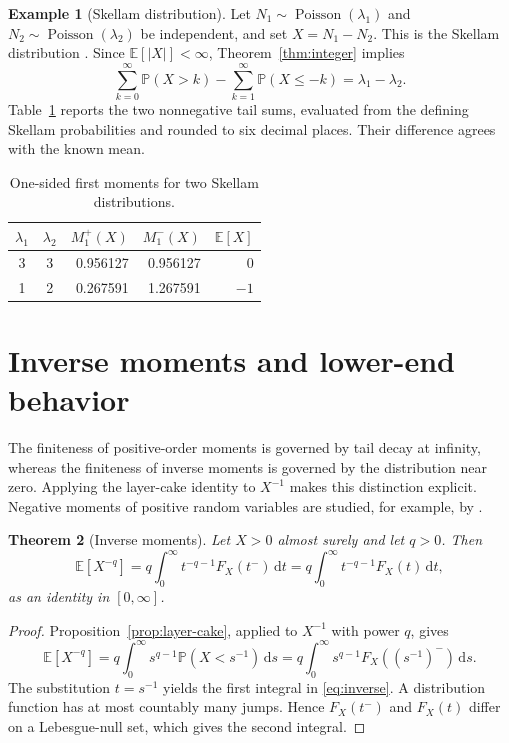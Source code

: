 \documentclass[11pt]{article}
\newtheorem{theorem}{Theorem}[section]
\theoremstyle{definition}
\newtheorem{example}[theorem]{Example}
\theoremstyle{remark}
\newcommand{\E}{\mathbb{E}}
\newcommand{\Pp}{\mathbb{P}}
\newcommand{\dd}{\,\mathrm{d}}
\newcommand{\abs}[1]{\left\lvert #1\right\rvert}
\begin{document}
\begin{example}[Skellam distribution]\label{ex:skellam}
Let $N_1\sim\operatorname{Poisson}(\lambda_1)$ and
$N_2\sim\operatorname{Poisson}(\lambda_2)$ be independent, and set
$X=N_1-N_2$.  This is the Skellam distribution
\citep{Skellam1946}.  Since $\E[\abs X]<\infty$,
Theorem~\ref{thm:integer} implies
\[
  \sum_{k=0}^\infty\Pp(X>k)
  -\sum_{k=1}^\infty\Pp(X\leq-k)
  =\lambda_1-\lambda_2.
\]
Table~\ref{tab:skellam} reports the two nonnegative tail sums, evaluated from
the defining Skellam probabilities and rounded to six decimal places.  Their
difference agrees with the known mean.

\begin{table}[h]
\centering
\caption{One-sided first moments for two Skellam distributions.}
\label{tab:skellam}
\begin{tabular}{ccrrr}
\toprule
$\lambda_1$&$\lambda_2$&$M_1^+(X)$&$M_1^-(X)$&$\E[X]$\\
\midrule
3&3&0.956127&0.956127&0\\
1&2&0.267591&1.267591&$-1$\\
\bottomrule
\end{tabular}
\end{table}
\end{example}

\section{Inverse moments and lower-end behavior}
\label{sec:inverse}

The finiteness of positive-order moments is governed by tail decay at
infinity, whereas the finiteness of inverse moments is governed by the
distribution near zero.  Applying the layer-cake identity to $X^{-1}$ makes
this distinction explicit.  Negative moments of positive random variables
are studied, for example, by \citet{ChaoStrawderman1972}.

\begin{theorem}[Inverse moments]\label{thm:inverse}
Let $X>0$ almost surely and let $q>0$.  Then
\begin{equation}\label{eq:inverse}
  \E[X^{-q}]
  =q\int_0^\infty t^{-q-1}F_X(t^-)\dd t
  =q\int_0^\infty t^{-q-1}F_X(t)\dd t,
\end{equation}
as an identity in $[0,\infty]$.
\end{theorem}

\begin{proof}
Proposition~\ref{prop:layer-cake}, applied to $X^{-1}$ with power $q$,
gives
\[
  \E[X^{-q}]
  =q\int_0^\infty s^{q-1}\Pp(X<s^{-1})\dd s
  =q\int_0^\infty s^{q-1}F_X((s^{-1})^-)\dd s.
\]
The substitution $t=s^{-1}$ yields the first integral in
\eqref{eq:inverse}.  A distribution function has at most countably many
jumps.  Hence $F_X(t^-)$ and $F_X(t)$ differ on a Lebesgue-null set, which
gives the second integral.
\end{proof}
\end{document}
